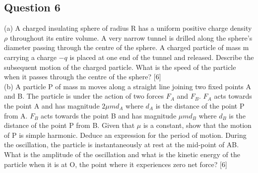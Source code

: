 \documentclass{article}
\begin{document}
\subsection{Question 6}
(a) A charged insulating sphere of radius R has a uniform positive charge density $\rho$ throughout its entire volume. A very narrow tunnel is drilled along the sphere’s diameter passing through the centre of the sphere. A charged particle of mass m carrying a charge $-q$ is placed at one end of the tunnel and released. Describe the subsequent motion of the charged particle. What is the speed of the particle when it passes through the centre of the sphere? [6] \\
(b) A particle P of mass m moves along a straight line joining two fixed points A and B. The particle is under the action of two forces $F_A$ and $F_B$. $F_A$ acts towards the point A and has magnitude $2\mu m d_A$ where $d_A$ is the distance of the point P from A. $F_B$ acts towards the point B and has magnitude $\mu m d_B$ where $d_B$ is the distance of the point P from B. Given that $\mu$ is a constant, show that the motion of P is simple harmonic. Deduce an expression for the period of motion. During the oscillation, the particle is instantaneously at rest at the mid-point of AB. What is the amplitude of the oscillation and what is the kinetic energy of the particle when it is at O, the point where it experiences zero net force? [6]
\end{document}
